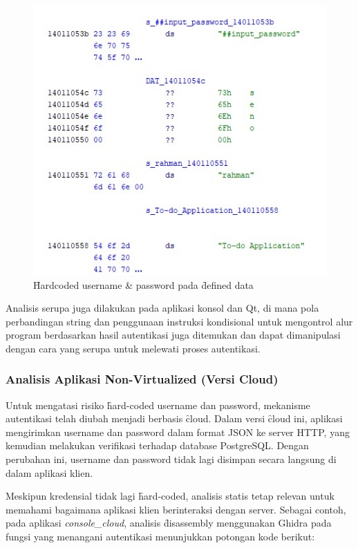 \begin{figure}
	\centering
	\includegraphics[width=0.45\textheight]
	{assets/pics/hardcoded_credentials.jpeg}
  \caption{\f{Hardcoded username \& password} pada \f{defined data}}
\end{figure}

Analisis serupa juga dilakukan pada aplikasi konsol dan Qt, di mana pola perbandingan string dan penggunaan instruksi kondisional untuk mengontrol alur program berdasarkan hasil autentikasi juga ditemukan dan dapat dimanipulasi dengan cara yang serupa untuk melewati proses autentikasi.

\subsubsection{Analisis Aplikasi Non-Virtualized (Versi Cloud)}
Untuk mengatasi risiko \f{hard-coded} username dan password, mekanisme autentikasi telah diubah menjadi berbasis \f{cloud}. Dalam versi \f{cloud} ini, aplikasi mengirimkan username dan password dalam format JSON ke server HTTP, yang kemudian melakukan verifikasi terhadap database PostgreSQL. Dengan perubahan ini, username dan password tidak lagi disimpan secara langsung di dalam aplikasi klien.

Meskipun kredensial tidak lagi \f{hard-coded}, analisis statis tetap relevan untuk memahami bagaimana aplikasi klien berinteraksi dengan server. Sebagai contoh, pada aplikasi \textit{console\_cloud}, analisis \f{disassembly} menggunakan Ghidra pada fungsi yang menangani autentikasi menunjukkan potongan kode berikut:

